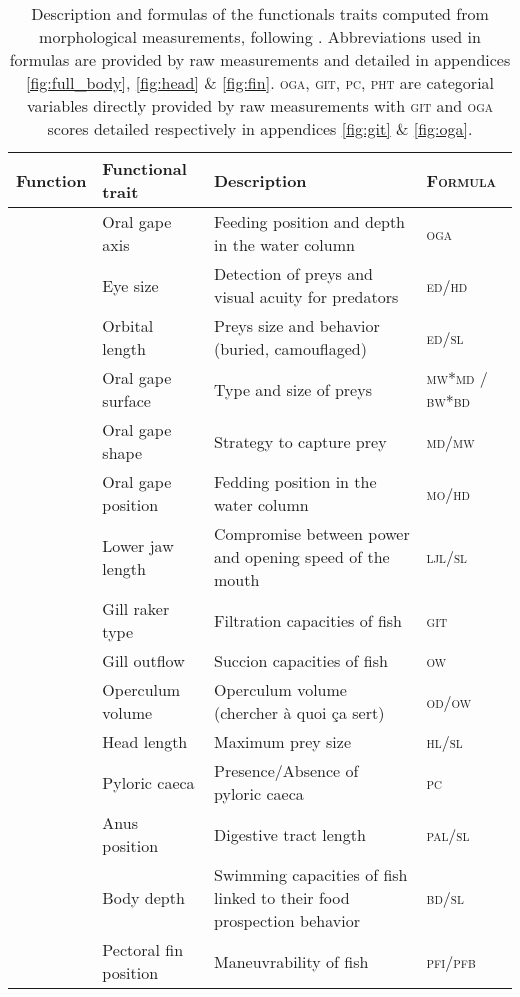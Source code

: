 \begin{sidewaystable}
\centering
\caption{Description and formulas of the functionals traits computed from morphological measurements, following \citep{albouy2011, aneeshkumar2017,boyle2006,brindamour2016,diderich2006,dumay2004,habib2019,ibanez2007,sibbing2000,webb1984,winemiller1991}. Abbreviations used in formulas are provided by raw measurements and detailed in appendices \ref{fig:full_body}, \ref{fig:head} \& \ref{fig:fin}. \textsc{oga}, \textsc{git}, \textsc{pc}, \textsc{pht} are categorial variables directly provided by raw measurements with \textsc{git} and \textsc{oga} scores detailed respectively in appendices \ref{fig:git} \& \ref{fig:oga}.}
\label{table:functraits}
\begin{tabular}{>{\bfseries}lll>{\scshape}l}
  \hline
Function & Functional trait & Description & Formula  \\ 
  \hline
\multirow{13}{*}{Feeding} &Oral gape axis & Feeding position and depth in the water column & oga \\ 
  &Eye size & Detection of preys and visual acuity for predators & ed/hd \\ 
  &Orbital length & Preys size and behavior (buried, camouflaged) & ed/sl \\ 
  &Oral gape surface & Type and size of preys & mw*md / bw*bd \\ 
  &Oral gape shape & Strategy to capture prey & md/mw \\ 
  &Oral gape position & Fedding position in the water column & mo/hd \\ 
  &Lower jaw length & Compromise between power and opening speed of the mouth & ljl/sl \\ 
  &Gill raker type & Filtration capacities of fish & git \\ 
  &Gill outflow & Succion capacities of fish & ow \\ 
  &Operculum volume & Operculum volume (chercher à quoi ça sert) & od/ow \\ 
  &Head length & Maximum prey size & hl/sl \\ 
  &Pyloric caeca & Presence/Absence of pyloric caeca & pc \\ 
  &Anus position & Digestive tract length & pal/sl \\ 
  \hline
  \multirow{6}{*}{Locomotion} & Body depth & Swimming capacities of fish linked to their food prospection behavior & bd/sl \\ 
  &Pectoral fin position & Maneuvrability of fish & pfi/pfb \\ 

\end{tabular}
\end{sidewaystable}
